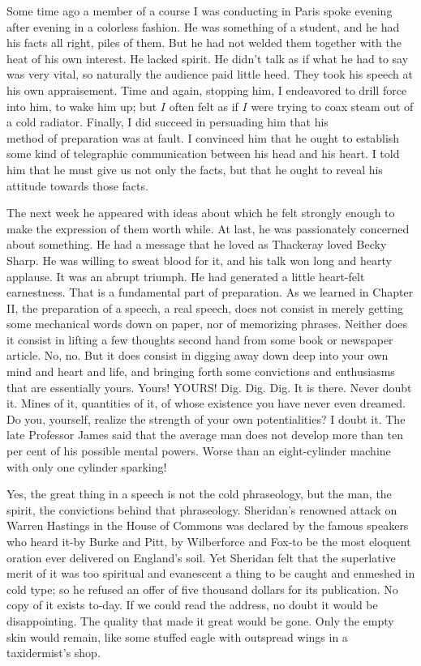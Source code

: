 \documentclass[10pt]{article}
\begin{document}
Some time ago a member of a course I was conducting in Paris spoke evening after evening in a colorless fashion. He was something of a student, and he had his facts all right, piles of them. But he had not welded them together with the heat of his own interest. He lacked spirit. He didn't talk as if what he had to say was very vital, so naturally the audience paid little heed. They took his speech at his own appraisement. Time and again, stopping him, I endeavored to drill force into him, to wake him up; but $I$ often felt as if $I$ were trying to coax steam out of a cold radiator. Finally, I did succeed in persuading him that his\\
method of preparation was at fault. I convinced him that he ought to establish some kind of telegraphic communication between his head and his heart. I told him that he must give us not only the facts, but that he ought to reveal his attitude towards those facts.

The next week he appeared with ideas about which he felt strongly enough to make the expression of them worth while. At last, he was passionately concerned about something. He had a message that he loved as Thackeray loved Becky Sharp. He was willing to sweat blood for it, and his talk won long and hearty applause. It was an abrupt triumph. He had generated a little heart-felt earnestness. That is a fundamental part of preparation. As we learned in Chapter II, the preparation of a speech, a real speech, does not consist in merely getting some mechanical words down on paper, nor of memorizing phrases. Neither does it consist in lifting a few thoughts second hand from some book or newspaper article. No, no. But it does consist in digging away down deep into your own mind and heart and life, and bringing forth some convictions and enthusiasms that are essentially yours. Yours! YOURS! Dig. Dig. Dig. It is there. Never doubt it. Mines of it, quantities of it, of whose existence you have never even dreamed. Do you, yourself, realize the strength of your own potentialities? I doubt it. The late Professor James said that the average man does not develop more than ten per cent of his possible mental powers. Worse than an eight-cylinder machine with only one cylinder sparking!

Yes, the great thing in a speech is not the cold phraseology, but the man, the spirit, the convictions behind that phraseology. Sheridan's renowned attack on Warren Hastings in the House of Commons was declared by the famous speakers who heard it-by Burke and Pitt, by Wilberforce and Fox-to be the most eloquent oration ever delivered on England's soil. Yet Sheridan felt that the superlative merit of it was too spiritual and evanescent a thing to be caught and enmeshed in cold type; so he refused an offer of five thousand dollars for its publication. No copy of it exists to-day. If we could read the address, no doubt it would be disappointing. The quality that made it great would be gone. Only the empty skin would remain, like some stuffed eagle with outspread wings in a taxidermist's shop.
\end{document}
